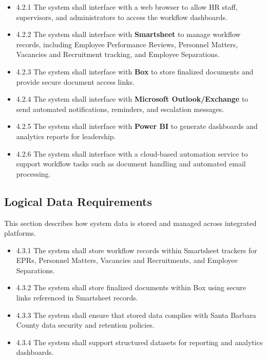 \documentclass[12pt]{article}
\begin{document}
\begin{itemize}
    \item 4.2.1 The system shall interface with a web browser to allow HR staff, supervisors, and administrators to access the workflow dashboards.

    \item 4.2.2 The system shall interface with \textbf{Smartsheet} to manage workflow records, including Employee Performance Reviews, Personnel Matters, Vacancies and Recruitment tracking, and Employee Separations.

    \item 4.2.3 The system shall interface with \textbf{Box} to store finalized documents and provide secure document access links.

    \item 4.2.4 The system shall interface with \textbf{Microsoft Outlook/Exchange} to send automated notifications, reminders, and escalation messages.

    \item 4.2.5 The system shall interface with \textbf{Power BI} to generate dashboards and analytics reports for leadership.

    \item 4.2.6 The system shall interface with a cloud-based automation service to support workflow tasks such as document handling and automated email processing.
\end{itemize}

\subsection{Logical Data Requirements}

This section describes how system data is stored and managed across integrated platforms.

\begin{itemize}
    \item 4.3.1 The system shall store workflow records within Smartsheet trackers for EPRs, Personnel Matters, Vacancies and Recruitments, and Employee Separations.

    \item 4.3.2 The system shall store finalized documents within Box using secure links referenced in Smartsheet records.

    \item 4.3.3 The system shall ensure that stored data complies with Santa Barbara County data security and retention policies.

    \item 4.3.4 The system shall support structured datasets for reporting and analytics dashboards.
\end{itemize}
\end{document}
